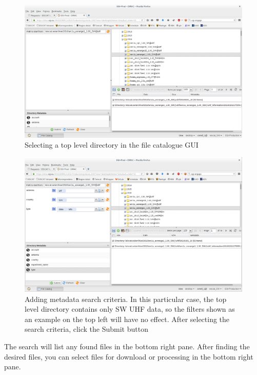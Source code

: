 \documentclass[a4paper]{article}
\begin{document}
\begin{figure}[htb]
  \centering
  \includegraphics[width=1.0\linewidth]{dirac-gui-catalogue}
  \caption{Selecting a top level directory in the file catalogue GUI}
  \label{fig:catalogue}
\end{figure}



\label{sec:searching}
\begin{figure}[htb]
  \centering
  \includegraphics[width=1.0\linewidth]{dirac-gui-search}
  \caption{Adding metadata search criteria. In this particular case, the top level directory contains only SW UHF data, so the filters shown as an example on the top left will have no effect. After selecting the search criteria, click the Submit button}
  \label{fig:search}
\end{figure}


The search will list any found files in the bottom right pane.  After
finding the desired files, you can select files for download or
processing in the bottom right pane.
\end{document}
